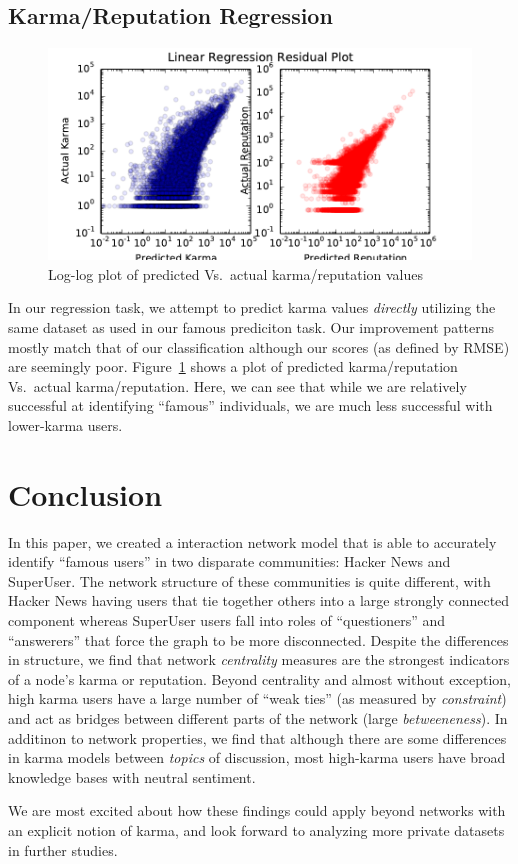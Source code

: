 \documentclass[11pt]{article}
\begin{document}

\subsection{Karma/Reputation Regression}
\label{sec:regression}
\begin{figure}[h]
\centering
\includegraphics[width=\linewidth]{residuals}
\caption{Log-log plot of predicted Vs.\ actual karma/reputation values}
\label{fig:residuals}
\end{figure}

In our regression task, we attempt to predict karma values \textit{directly}
utilizing the same dataset as used in our famous prediciton task. Our
improvement patterns mostly match that of our classification although our scores
(as defined by RMSE) are seemingly poor. Figure~\ref{fig:residuals} shows a plot
of predicted karma/reputation Vs.\ actual karma/reputation. Here, we can see that
while we are relatively successful at identifying ``famous'' individuals, we are
much less successful with lower-karma users.


\section{Conclusion}
In this paper, we created a interaction network model that is able to accurately 
identify ``famous users'' in two disparate communities: Hacker News and
SuperUser. The network structure of these communities is quite different, with
Hacker News having users that tie together others into a large strongly
connected component whereas SuperUser users fall into roles of ``questioners''
and ``answerers'' that force the graph to be more disconnected. Despite the
differences in structure, we find that network \textit{centrality} measures are
the strongest indicators of a node's karma or reputation. Beyond centrality and 
almost without exception, high karma users have a large number of ``weak ties''
(as measured by \textit{constraint}) and act as bridges between 
different parts of the network (large \textit{betweeneness}). In additinon to
network properties, we find that although there are some differences in karma
models between \textit{topics} of discussion, most high-karma users have broad
knowledge bases with neutral sentiment. 

We are most excited about how these findings could apply beyond networks with an
explicit notion of karma, and look forward to analyzing more private datasets in
further studies.

{} 
\end{document}
